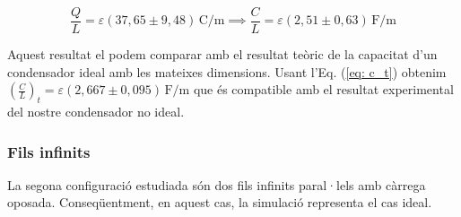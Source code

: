 \documentclass[11pt]{article}
\numberwithin{equation}{section}
\numberwithin{figure}{section}
\numberwithin{table}{section}
\begin{document}
\[
\frac{Q}{L} = \varepsilon  (37{,}65 \pm 9{,}48)\, \mathrm{C/m} \implies
\boxed{ \frac{C}{L} = \varepsilon  (2{,}51 \pm 0{,}63)\, \mathrm{F/m} }
\]    

Aquest resultat el podem comparar amb el resultat teòric de la capacitat d'un condensador ideal amb les mateixes dimensions. Usant l'Eq. (\ref{eq: c_t}) obtenim $(\frac{C}{L})_t =\varepsilon(2,667 \pm 0,095)\, \mathrm{F/m}$ que és compatible amb el resultat experimental del nostre condensador no ideal.

\subsubsection{Fils infinits}\label{sec: fils}
La segona configuració estudiada són dos fils infinits paral·lels amb càrrega oposada. Conseqüentment, en aquest cas, la simulació representa el cas ideal.
\end{document}
